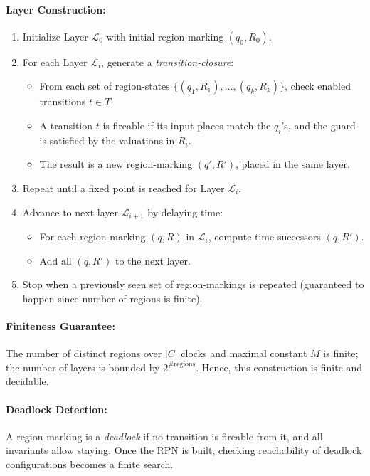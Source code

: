 \documentclass{article}
\begin{document}
\paragraph{Layer Construction:}
\begin{enumerate}[label=\textbf{Step \arabic*:}, leftmargin=2.5em]
  \item Initialize Layer $\mathcal{L}_0$ with initial region-marking $(q_0, R_0)$.
  \item For each Layer $\mathcal{L}_i$, generate a \emph{transition-closure}:
    \begin{itemize}[noitemsep]
      \item From each set of region-states $\{(q_1, R_1), \dots, (q_k, R_k)\}$, check enabled transitions $t \in T$.
      \item A transition $t$ is fireable if its input places match the $q_i$'s, and the guard is satisfied by the valuations in $R_i$.
      \item The result is a new region-marking $(q', R')$, placed in the same layer.
    \end{itemize}
  \item Repeat until a fixed point is reached for Layer $\mathcal{L}_i$.
  \item Advance to next layer $\mathcal{L}_{i+1}$ by delaying time:
    \begin{itemize}[noitemsep]
      \item For each region-marking $(q, R)$ in $\mathcal{L}_i$, compute time-successors $(q, R')$.
      \item Add all $(q, R')$ to the next layer.
    \end{itemize}
  \item Stop when a previously seen set of region-markings is repeated (guaranteed to happen since number of regions is finite).
\end{enumerate}

\paragraph{Finiteness Guarantee:}
The number of distinct regions over $|C|$ clocks and maximal constant $M$ is finite; the number of layers is bounded by $2^{\# \text{regions}}$. Hence, this construction is finite and decidable.

\paragraph{Deadlock Detection:}
A region-marking is a \emph{deadlock} if no transition is fireable from it, and all invariants allow staying. Once the RPN is built, checking reachability of deadlock configurations becomes a finite search.
\end{document}
